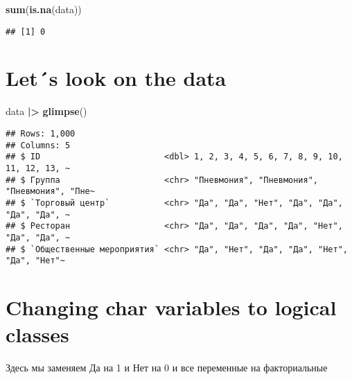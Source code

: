 \documentclass[
]{article}
\newenvironment{Shaded}{\begin{snugshade}}{\end{snugshade}}
\newcommand{\FunctionTok}[1]{\textcolor[rgb]{0.13,0.29,0.53}{\textbf{#1}}}
\newcommand{\NormalTok}[1]{#1}
\newcommand{\SpecialCharTok}[1]{\textcolor[rgb]{0.81,0.36,0.00}{\textbf{#1}}}
\begin{document}
\begin{Shaded}
\begin{Highlighting}[]
\FunctionTok{sum}\NormalTok{(}\FunctionTok{is.na}\NormalTok{(data))}
\end{Highlighting}
\end{Shaded}

\begin{verbatim}
## [1] 0
\end{verbatim}

\section{Let´s look on the data}\label{lets-look-on-the-data-1}

\begin{Shaded}
\begin{Highlighting}[]
\NormalTok{data }\SpecialCharTok{|\textgreater{}} \FunctionTok{glimpse}\NormalTok{()}
\end{Highlighting}
\end{Shaded}

\begin{verbatim}
## Rows: 1,000
## Columns: 5
## $ ID                         <dbl> 1, 2, 3, 4, 5, 6, 7, 8, 9, 10, 11, 12, 13, ~
## $ Группа                     <chr> "Пневмония", "Пневмония", "Пневмония", "Пне~
## $ `Торговый центр`           <chr> "Да", "Да", "Нет", "Да", "Да", "Да", "Да", ~
## $ Ресторан                   <chr> "Да", "Да", "Да", "Да", "Нет", "Да", "Да", ~
## $ `Общественные мероприятия` <chr> "Да", "Нет", "Да", "Да", "Нет", "Да", "Нет"~
\end{verbatim}

\section{Changing char variables to logical
classes}\label{changing-char-variables-to-logical-classes-1}

Здесь мы заменяем Да на 1 и Нет на 0 и все переменные на факториальные
\end{document}
